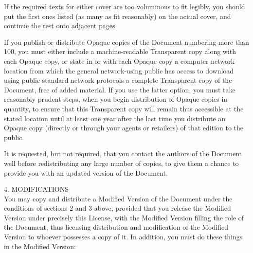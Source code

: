\documentclass[oneside,12pt]{memoir} %
\begin{document}
If the required texts for either cover are too voluminous to fit legibly, you should put the first ones listed (as many as fit reasonably) on the actual cover, and continue the rest onto adjacent pages.

If you publish or distribute Opaque copies of the Document numbering more than 100, you must either include a machine-readable Transparent copy along with each Opaque copy, or state in or with each Opaque copy a computer-network location from which the general network-using public has access to download using public-standard network protocols a complete Transparent copy of the Document, free of added material. If you use the latter option, you must take reasonably prudent steps, when you begin distribution of Opaque copies in quantity, to ensure that this Transparent copy will remain thus accessible at the stated location until at least one year after the last time you distribute an Opaque copy (directly or through your agents or retailers) of that edition to the public.

It is requested, but not required, that you contact the authors of the Document well before redistributing any large number of copies, to give them a chance to provide you with an updated version of the Document.

4. MODIFICATIONS\\

You may copy and distribute a Modified Version of the Document under the conditions of sections 2 and 3 above, provided that you release the Modified Version under precisely this License, with the Modified Version filling the role of the Document, thus licensing distribution and modification of the Modified Version to whoever possesses a copy of it. In addition, you must do these things in the Modified Version:
\end{document}
